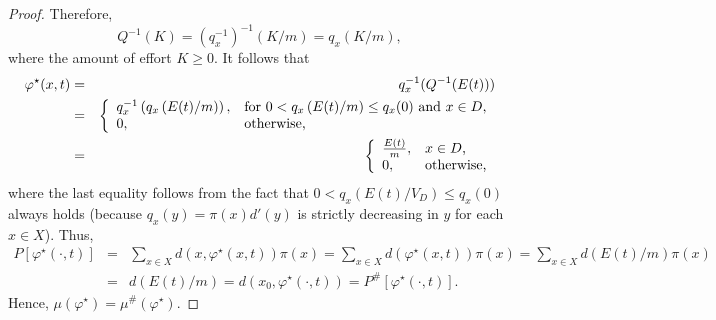 \documentclass[12pt]{article}
\theoremstyle{plain}
\theoremstyle{definition}
\theoremstyle{remark}
\begin{document}
\begin{proof}
Therefore, 
\[
Q^{-1}(K)=\left(q_x^{-1}\right)^{-1}\left(K/m\right)=q_x \left(K/m \right),
\]
where the amount of effort $K\geq 0$.  It follows that
\begin{eqnarray*}
\varphi^\star(x, t)&=&
q_x^{-1}(Q^{-1}(E(t)))\\
&=&\left\{
		                           \begin{array}{ll}
		                           q_x^{-1}\left(q_x \left(E(t)/m \right)\right),& \hbox{for $0<q_x \left(E(t)/m\right) \leq q_x(0)$ and $x\in D$,} \\
					0,  & \hbox{otherwise,} 
		                          \end{array}
		                         \right.\\
&=&\left\{
		                           \begin{array}{ll}
		                         \frac{E(t)}{m}, & \hbox{$x\in D$,} \\
					0,  & \hbox{otherwise,} 
		                          \end{array}
		                         \right.		                         
\end{eqnarray*}
where the last equality follows from the fact that $0<q_x \left(E(t)/V_D\right) \leq q_x(0)$ always holds (because $q_x(y)=\pi(x)d'(y)$ is strictly decreasing in $y$ for each $x\in X$). Thus, 
\begin{eqnarray*}
P[\varphi^\star(\cdot, t)] &=& \sum_{x\in X} d(x, \varphi^\star(x, t))\pi(x)
                                         = \sum_{x \in X} d(\varphi^\star(x, t))\pi(x) =\sum_{x\in X} d(E(t)/m)\pi(x) \\
                                         &= &d(E(t)/m)=d(x_0, \varphi^\star(\cdot, t))=P^{\#}[\varphi^\star(\cdot, t)].
\end{eqnarray*}
Hence,  $\mu(\varphi^\star)=\mu^{\#}(\varphi^\star)$.
\end{proof}
\end{document}
